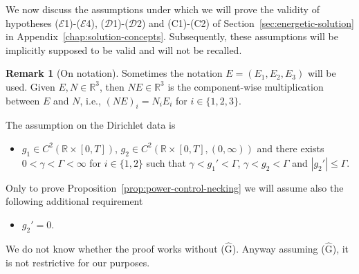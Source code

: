 \documentclass[a4paper,10pt,oneside]{amsbook}
\numberwithin{section}{chapter}
\numberwithin{equation}{chapter}
\theoremstyle{definition}
\newtheorem{rmk}[prop]{Remark}
\begin{document}
We now discuss the assumptions under which we will prove the validity of hypotheses ($\mathcal{E}$1)-($\mathcal{E}$4), ($\mathcal{D}$1)-($\mathcal{D}$2) and (C1)-(C2) of Section~\ref{sec:energetic-solution} in Appendix~\ref{chap:solution-concepts}. Subsequently, these assumptions will be implicitly supposed to be valid and will not be recalled.
\begin{rmk}[On notation]
Sometimes the notation $E=(E_1,E_2,E_3)$ will be used. Given $E,N\in\mathbb{R}^3$, then $NE\in\mathbb{R}^3$ is the component-wise multiplication between $E$ and $N$, i.e., $(NE)_i=N_iE_i$ for $i\in\{1,2,3\}$.
\end{rmk}

The assumption on the Dirichlet data is
\begin{itemize}[itemsep=1em]
\item[(G)] $g_1\in C^2(\mathbb{R}\times[0,T])$, $g_2\in C^2(\mathbb{R}\times[0,T],(0,\infty))$ and there exists $0<\gamma<\Gamma<\infty$ for $i\in\{1,2\}$ such that $\gamma<g_1'<\Gamma$, $\gamma<g_2<\Gamma$ and $|g_2'|\le\Gamma$.
\end{itemize}
Only to prove Proposition~\ref{prop:power-control-necking} we will assume also the following additional requirement
\begin{itemize}
\item[($\hat{\text{G}}$)] $g_2'=0$.
\end{itemize}
We do not know whether the proof works without ($\hat{\text{G}}$). Anyway assuming ($\hat{\text{G}}$), it is not restrictive for our purposes.
\end{document}
